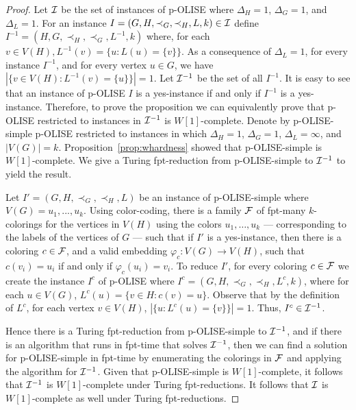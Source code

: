 \documentclass[11pt]{article}
\let\phi=\varphi
\begin{document}
\begin{proof}
Let ${\cal I}$ be the set of instances of p-OLISE where $\Delta_H = 1$, $\Delta_G = 1$, and $\Delta_L = 1$.  For an instance $I = (G, H, \prec_G, \prec_H, L, k)\in {\cal I}$ define $I^{-1} = (H, G, \prec_H, \prec_G, L^{-1}, k)$ where, for each $v \in V(H), L^{-1}(v) = \{u : L(u) = \{v\}\}$. As a consequence of $\Delta_L = 1$, for every instance $I^{-1}$, and for every vertex $u \in G$, we have $|\{v \in V(H): L^{-1}(v) = \{u\}\}| = 1$. Let ${\cal I}^{-1}$ be the set of all $I^{-1}$.  It is easy to see that an instance of p-OLISE $I$ is a yes-instance if and only if $I^{-1}$ is a yes-instance.  Therefore, to prove the proposition we can equivalently prove that p-OLISE restricted to instances in ${\cal I}^{-1}$ is $W[1]$-complete.  Denote by p-OLISE-simple p-OLISE restricted to instances in which $\Delta_H = 1$, $\Delta_G = 1$, $\Delta_L = \infty$, and $|V(G)| = k$.  Proposition~\ref{prop:whardness} showed that p-OLISE-simple is $W[1]$-complete.  We give a Turing fpt-reduction from p-OLISE-simple to ${\cal I}^{-1}$ to yield the result.

Let $I' = (G, H, \prec_G, \prec_H, L)$ be an instance of p-OLISE-simple where $V(G) = {u_1, ..., u_k}$.   Using color-coding, there is a family ${\cal F}$ of fpt-many $k$-colorings for the vertices in $V(H)$ using the colors ${u_1, \ldots , u_k}$ --- corresponding to the labels of the vertices of $G$ --- such that if $I'$ is a yes-instance, then there is a coloring $c \in {\cal F}$, and a valid embedding  $\phi_c : V(G) \to V(H)$, such that $c(v_i) = u_i$ if and only if $\phi_c(u_i) = v_i$.  To reduce $I'$, for every coloring $c \in {\cal F}$ we create the instance $I^c$ of p-OLISE where $I^c = (G, H, \prec_G, \prec_H, L^{c}, k)$, where for each $u \in V(G)$, $L^{c}(u) = \{v \in H: c(v) = u\}$.  Observe that by the definition of $L^c$, for each vertex $v \in V(H)$, $|\{u : L^c(u) = \{v\}\}| = 1$.  Thus, $I^c \in {\cal I}^{-1}$.

Hence there is a Turing fpt-reduction from p-OLISE-simple to ${\cal I}^{-1}$, and if there is an algorithm that runs in fpt-time that solves ${\cal I}^{-1}$, then we can find a solution for p-OLISE-simple in fpt-time by enumerating the colorings in ${\cal F}$ and applying the algorithm for ${\cal I}^{-1}$. Given that p-OLISE-simple is $W[1]$-complete, it follows that ${\cal I}^{-1}$ is $W[1]$-complete under Turing fpt-reductions.  It follows that ${\cal I}$ is $W[1]$-complete as well under Turing fpt-reductions.
\end{proof}
\end{document}
